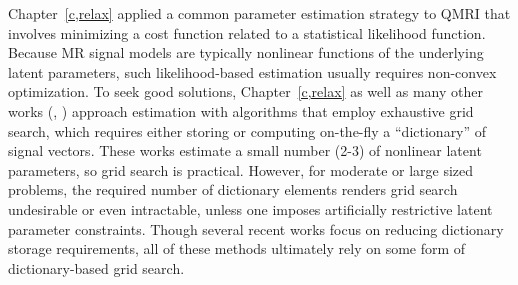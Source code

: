 Chapter~\ref{c,relax} applied
a common parameter estimation strategy to QMRI
that involves minimizing a cost function
related to a statistical likelihood function.
Because MR signal models are typically nonlinear functions
of the underlying latent parameters,
such likelihood-based estimation
usually requires non-convex optimization.
To seek good solutions,
Chapter~\ref{c,relax}
as well as many other works
(\eg, 
\cite{%
	haldar:07:mle,%
	hernando:08:jeo,%
	barral:10:arm,%
	staroswiecki:12:seo,%
	ma:13:mrf,%
	trzasko:13:etf,%
	mcgivney:14:scf,%
	zhao:14:mbm,%
	beneliezer:15:raa,%
		zhao:15:amp,%
	cauley:15:fgm,%
	zhao:16:mlr,%
	nataraj:17:oms,%
	asslander::lra,%
	yang::lra%
})
approach estimation
with algorithms
that employ exhaustive grid search,
which requires either storing
or computing on-the-fly 
a ``dictionary'' of signal vectors.
These works estimate a small number (2-3)
of nonlinear latent parameters,
so grid search is practical.
However, 
for moderate or large sized problems,
the required number 
of dictionary elements
renders grid search undesirable or even intractable,
unless one imposes artificially restrictive latent parameter constraints.
Though several recent works
\cite{%
	mcgivney:14:scf,%
	cauley:15:fgm,%
	asslander::lra,%
	yang::lra%
}
focus on reducing dictionary storage requirements,
all of these methods ultimately rely 
on some form of dictionary-based grid search.

